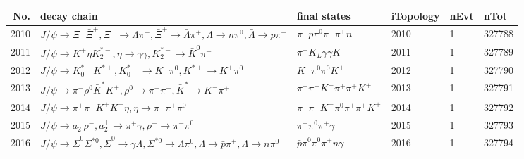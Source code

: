 \begin{table}[htbp] 
\begin{center}
\begin{small}
\begin{tabular}{rlllll}\hline\hline
 No. & decay chain & final states &  iTopology & nEvt & nTot \\\hline
2010&$J/\psi       \rightarrow \Xi^-             \bar{\Xi}^+      , \Xi^-              \rightarrow \Lambda           \pi^{-}        , \bar{\Xi}^+       \rightarrow \bar{\Lambda}    \pi^{+}        , \Lambda            \rightarrow n                 \pi^{0}        , \bar{\Lambda}     \rightarrow \bar{p}          \pi^{+}        $&$\pi^{-}        \bar{p}          \pi^{0}        \pi^{+}        \pi^{+}        n                 $& 2010&    1&327788\\
2011&$J/\psi       \rightarrow K^{+}          \eta          K_2^{*-}       , \eta           \rightarrow \gamma       \gamma       , K_2^{*-}        \rightarrow \bar{K}^{0}   \pi^{-}        $&$\pi^{-}        K_{L}          \gamma       \gamma       K^{+}          $& 2011&    1&327789\\
2012&$J/\psi       \rightarrow K_{0}^{*-}     K^{*+}         , K_{0}^{*-}      \rightarrow K^{-}          \pi^{0}        , K^{*+}          \rightarrow K^{+}          \pi^{0}        $&$K^{-}          \pi^{0}        \pi^{0}        K^{+}          $& 2012&    1&327790\\
2013&$J/\psi       \rightarrow \pi^{-}        \rho^{0}      \bar{K}^{*}   K^{+}          , \rho^{0}       \rightarrow \pi^{+}        \pi^{-}        , \bar{K}^{*}    \rightarrow K^{-}          \pi^{+}        $&$\pi^{-}        \pi^{-}        K^{-}          \pi^{+}        \pi^{+}        K^{+}          $& 2013&    1&327791\\
2014&$J/\psi       \rightarrow \pi^{+}        \pi^{-}        K^{+}          K^{-}          \eta          , \eta           \rightarrow \pi^{-}        \pi^{+}        \pi^{0}        $&$\pi^{-}        \pi^{-}        K^{-}          \pi^{0}        \pi^{+}        \pi^{+}        K^{+}          $& 2014&    1&327792\\
2015&$J/\psi       \rightarrow a_{2}^{+}      \rho^{-}      , a_{2}^{+}       \rightarrow \pi^{+}        \gamma       , \rho^{-}       \rightarrow \pi^{-}        \pi^{0}        $&$\pi^{-}        \pi^{0}        \pi^{+}        \gamma       $& 2015&    1&327793\\
2016&$J/\psi       \rightarrow \bar{\Sigma}^0   \Sigma^{*0}       , \bar{\Sigma}^0    \rightarrow \gamma       \bar{\Lambda}    , \Sigma^{*0}        \rightarrow \Lambda           \pi^{0}        , \bar{\Lambda}     \rightarrow \bar{p}          \pi^{+}        , \Lambda            \rightarrow n                 \pi^{0}        $&$\bar{p}          \pi^{0}        \pi^{0}        \pi^{+}        n                 \gamma       $& 2016&    1&327794\\

\end{tabular}
\end{small}
\end{center}
\end{table}
